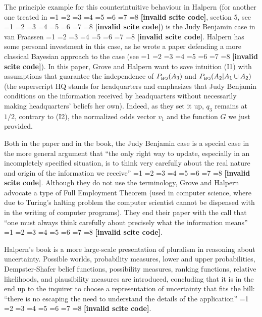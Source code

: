 \documentclass[11pt]{article}
\newcommand{\qeins}[1]{``#1''}
\newif\ifNumericalOrYear
\newcommand{\PageP}{p.~}
\newcommand{\PageP}{}
\newcommand{\scite}[3]{\ifnum#1=1\ifNumericalOrYear\citep{#2}\else\citeyearpar{#2}\fi\else
\ifnum#1=2\ifNumericalOrYear\citep[#3]{#2}\else\citep[{\PageP}#3]{#2}\fi\else
\ifnum#1=3\ifNumericalOrYear(\citet[#3]{#2})\else\citep[{\PageP}#3]{#2}\fi\else
\ifnum#1=4\ifNumericalOrYear\citet{#2}\else\citet{#2}\fi\else
\ifnum#1=5\ifNumericalOrYear(\citet{#2})\else\citep{#2}\fi\else
\ifnum#1=6\ifNumericalOrYear(\citet[#3]{#2})\else\citep[{\PageP}#3]{#2}\fi\else
\ifnum#1=7\ifNumericalOrYear\citep{#2}\else\citealp{#2}\fi\else
\ifnum#1=8\ifNumericalOrYear\citep[#3]{#2}\else\citealp[{\PageP}#3]{#2}\fi\else
\textbf{[invalid scite code]}\fi\fi\fi\fi\fi\fi\fi\fi}
\begin{document}
The principle example for this counterintuitive behaviour in Halpern
(for another one treated in \scite{7}{uffink96}{}, section 5, see
\scite{7}{diasshimony81}{}) is the Judy Benjamin case in van Fraassen
\scite{1}{fraassen81}{}. Halpern has some personal investment in this
case, as he wrote a paper defending a more classical Bayesian approach
to the case (see \scite{7}{grovehalpern97}{}). In this paper, Grove
and Halpern want to save intuition (I1) with assumptions that
guarantee the independence of $P_{\mbox{\tiny{HQ}}}(A_{3})$ and
$P_{\mbox{\tiny{HQ}}}(A_{2}|A_{1}\cup{}A_{2})$ (the superscript HQ
stands for headquarters and emphasizes that Judy Benjamin conditions
on the information received by headquarters without necessarily making
headquarters' beliefs her own). Indeed, as they set it up, $q_{3}$
remains at $1/2$, contrary to (I2), the normalized odds vector $v_{1}$
and the function $G$ we just provided.

Both in the paper and in the book, the Judy Benjamin case is a special
case in the more general argument that \qeins{the only right way to
  update, especially in an incompletely specified situation, is to
  think very carefully about the real nature and origin of the
  information we receive} \scite{2}{grovehalpern97}{3}. Although they
do not use the terminology, Grove and Halpern advocate a type of Full
Employment Theorem (used in computer science, where due to Turing's
halting problem the computer scientist cannot be dispensed with in the
writing of computer programs). They end their paper with the call that
\qeins{one must always think carefully about precisely what the
  information means} \scite{2}{grovehalpern97}{6}.

Halpern's book is a more large-scale presentation of pluralism in
reasoning about uncertainty. Possible worlds, probability measures,
lower and upper probabilities, Dempster-Shafer belief functions,
possibility measures, ranking functions, relative likelihoods,
and plausibility measures are introduced, concluding that it is in the
end up to the inquirer to choose a representation of uncertainty that
fits the bill: \qeins{there is no escaping the need to understand the
  details of the application} \scite{2}{halpern03}{423}.
\end{document}
